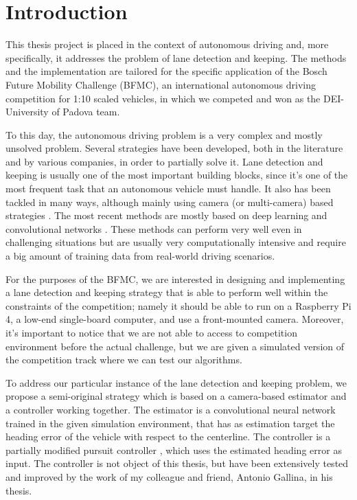 \documentclass[a4paper,12pt,sort&compress]{article}
\begin{document}
\tableofcontents
\newpage

\section{Introduction}

    This thesis project is placed in the context of autonomous driving and, more specifically, it
    addresses the problem of lane detection and keeping. The methods and the implementation are
    tailored for the specific application of the Bosch Future Mobility Challenge (BFMC), an
    international autonomous driving competition for 1:10 scaled vehicles, in which we competed and
    won as the DEI-University of Padova team. 

    To this day, the autonomous driving problem is a very complex and mostly unsolved problem.  Several
    strategies have been developed, both in the literature and by various companies, in order to
    partially solve it. Lane detection and keeping is usually one of the most important building
    blocks, since it's one of the most frequent task that an autonomous vehicle must handle. It
    also has been tackled in many ways, although mainly using camera  (or multi-camera)
    based strategies \citep*{1603550}. The most recent methods are mostly based on deep learning and
    convolutional networks \citep*{7407673}.
    These methods can perform very well even in challenging situations but are usually very
    computationally intensive and require a big amount of training data from real-world driving
    scenarios. 

    For the purposes of the BFMC, we are interested in designing and implementing a lane detection
    and keeping strategy that is able to perform well within the constraints of the competition;
    namely it should be able to run on a Raspberry Pi 4, a low-end single-board computer, and use a
    front-mounted camera. Moreover, it's important to notice that we are not able to access to competition
    environment before the actual challenge, but we are given a simulated version of the competition
    track where we can test our algorithms. 

    To address our particular instance of the lane detection and keeping problem, we propose a
    semi-original strategy which is based on a camera-based estimator and a controller working together. The
    estimator is a convolutional neural network trained in the given simulation environment, that
    has as estimation target the heading error of the vehicle with respect to the centerline. The
    controller is a partially modified pursuit controller \citep*{purepursuit}, which uses the
    estimated heading error as input. The controller is not object of this thesis, but have been
    extensively tested and improved by the work of my colleague and friend, Antonio Gallina, in his thesis.
\end{document}
